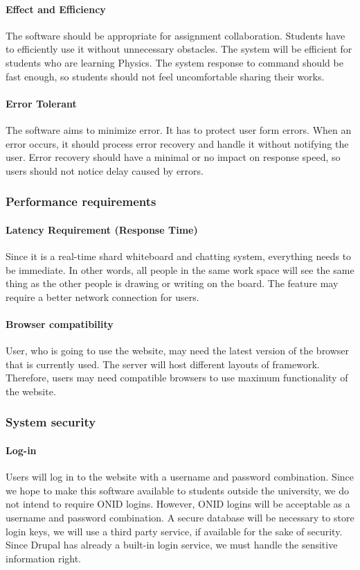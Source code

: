 \documentclass[10pt]{article}
\begin{document}
            \paragraph{Effect and Efficiency}
                The software should be appropriate for assignment collaboration. Students have to efficiently use it without unnecessary obstacles. The system will be efficient for students who are learning Physics. The system response to command should be fast enough, so students should not feel uncomfortable sharing their works.

            \paragraph{Error Tolerant}
                The software aims to minimize error. It has to protect user form errors. When an error occurs, it should process error recovery and handle it without notifying the user. Error recovery should have a minimal or no impact on response speed, so users should not notice delay caused by errors.

        \subsubsection{Performance requirements}
            \paragraph{Latency Requirement (Response Time)}
                Since it is a real-time shard whiteboard and chatting system, everything needs to be immediate. In other words, all people in the same work space will see the same thing as the other people is drawing or writing on the board. The feature may require a better network connection for users.
            \paragraph{Browser compatibility}
                User, who is going to use the website, may need the latest version of the browser that is currently used. The server will host different layouts of framework. Therefore, users may need compatible browsers to use maximum functionality of the website.

        \subsubsection{System security}
            \paragraph{Log-in}
                Users will log in to the website with a username and password combination. Since we hope to make this software available to students outside the university, we do not intend to require ONID logins. However, ONID logins will be acceptable as a username and password combination. A secure database will be necessary to store login keys, we will use a third party service, if available for the sake of security.
                Since Drupal has already a built-in login service, we must handle the sensitive information right.
\end{document}
